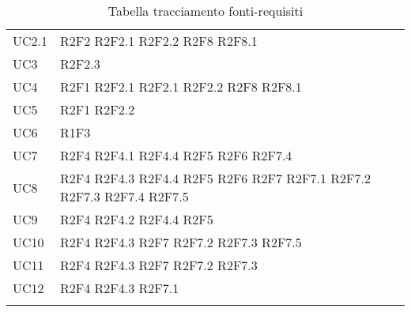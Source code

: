 \begin{center}
\begin{longtable}{  p{5cm} p{5cm} }
		UC2.1 & R2F2 \newline R2F2.1 \newline R2F2.2 \newline R2F8 \newline R2F8.1 \\
		UC3 & R2F2.3 \\
		UC4 & R2F1 \newline R2F2.1 \newline R2F2.1 \newline R2F2.2 \newline R2F8 \newline R2F8.1 \\
		UC5 & R2F1 \newline R2F2.2 \\
		UC6 & R1F3 \\
		UC7 & R2F4 \newline R2F4.1 \newline R2F4.4 \newline R2F5 \newline R2F6 \newline R2F7.4 \\
		UC8 & R2F4 \newline R2F4.3 \newline R2F4.4 \newline R2F5 \newline R2F6 \newline R2F7 \newline R2F7.1 \newline R2F7.2 \newline R2F7.3 \newline R2F7.4 \newline R2F7.5 \\
		UC9 & R2F4 \newline R2F4.2 \newline R2F4.4 \newline R2F5 \\
		UC10 & R2F4 \newline R2F4.3 \newline R2F7 \newline R2F7.2 \newline R2F7.3 \newline R2F7.5 \\
		UC11 & R2F4 \newline R2F4.3 \newline R2F7 \newline R2F7.2 \newline R2F7.3 \\
		UC12 & R2F4 \newline R2F4.3 \newline R2F7.1 \\
		\rowcolor{white}
		\caption{Tabella tracciamento fonti-requisiti}
	\end{longtable}
\end{center}

